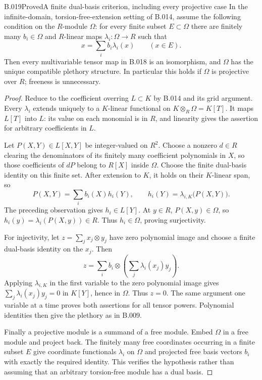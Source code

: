 \begin{saresult}{B.019}{Proved}{A finite dual-basis criterion, including every projective case}
In the infinite-domain, torsion-free-extension setting of B.014,
assume the following condition on the $R$-module $\Omega$: for every
finite subset $E\subset\Omega$ there are finitely many
$b_i\in\Omega$ and $R$-linear maps $\lambda_i:\Omega\to R$ such that
\[
 x=\sum_i b_i\lambda_i(x)\qquad(x\in E).
\]
Then every multivariable tensor map in B.018 is an isomorphism,
and $\Omega$ has the unique compatible plethory structure.
In particular this holds if $\Omega$ is projective over $R$;
freeness is unnecessary.
\end{saresult}
\begin{proof}
Reduce to the coefficient overring $L\subset K$ by B.014 and
its grid argument. Every $\lambda_i$ extends uniquely to a
$K$-linear functional on $K\otimes_R\Omega=K[T]$.
It maps $L[T]$ into $L$: its value on each monomial is in $R$,
and linearity gives the assertion for arbitrary coefficients in $L$.

Let $P(X,Y)\in L[X,Y]$ be integer-valued on $R^2$. Choose a nonzero
$d\in R$ clearing the denominators of its finitely many coefficient
polynomials in $X$, so those coefficients of $dP$ belong to $R[X]$
inside $\Omega$. Choose the finite dual-basis identity on this finite
set. After extension to $K$, it holds on their $K$-linear span,
so
\[
 P(X,Y)=\sum_i b_i(X)h_i(Y),\qquad
 h_i(Y)=\lambda_{i,K}\bigl(P(X,Y)\bigr).
\]
The preceding observation gives $h_i\in L[Y]$. At $y\in R$,
$P(X,y)\in\Omega$, so $h_i(y)=\lambda_i(P(X,y))\in R$.
Thus $h_i\in\Omega$, proving surjectivity.

For injectivity, let $z=\sum_j x_j\otimes y_j$ have zero polynomial
image and choose a finite dual-basis identity on the $x_j$. Then
\[
 z=\sum_i b_i\otimes\left(\sum_j\lambda_i(x_j)y_j\right).
\]
Applying $\lambda_{i,K}$ in the first variable to the zero polynomial
image gives $\sum_j\lambda_i(x_j)y_j=0$ in $K[Y]$, hence in $\Omega$.
Thus $z=0$. The same argument one variable at a time proves both
assertions for all tensor powers. Polynomial identities then give
the plethory as in B.009.

Finally a projective module is a summand of a free module. Embed
$\Omega$ in a free module and project back. The finitely many free
coordinates occurring in a finite subset $E$ give coordinate
functionals $\lambda_i$ on $\Omega$ and projected free basis vectors
$b_i$ with exactly the required identity. This verifies the
hypothesis rather than assuming that an arbitrary torsion-free
module has a dual basis.
\end{proof}

